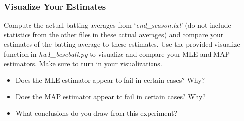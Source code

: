 \documentclass{article}
\begin{document}
\subsubsection*{Visualize Your Estimates}

Compute the actual batting averages from `\textit{end\_season.txt}' (do not include statistics from the other files in these actual averages) and compare your estimates of the batting average to these estimates. Use the provided visualize function in \textit{hw1\_baseball.py} to visualize and compare your MLE and MAP estimators. Make sure to turn in your visualizations.
\begin{itemize}
	\item Does the MLE estimator appear to fail in certain cases? Why?
	\item Does the MAP estimator appear to fail in certain cases? Why?
	\item What conclusions do you draw from this experiment?
\end{itemize}


\newpage
\end{document}
